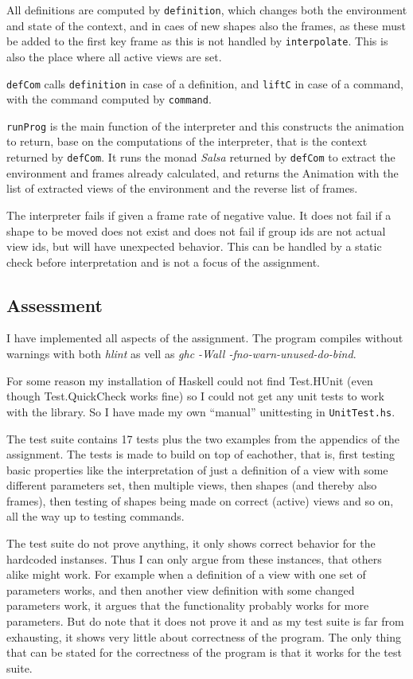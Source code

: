 \documentclass[a4paper, 10pt]{article}
\begin{document}
All definitions are computed by \texttt{definition}, which changes both the environment and state of the context, and in caes of new shapes also the frames, as these must be added to the first key frame as this is not handled by \texttt{interpolate}. This is also the place where all active views are set.

\texttt{defCom} calls \texttt{definition} in case of a definition, and \texttt{liftC} in case of a command, with the command computed by \texttt{command}.

\texttt{runProg} is the main function of the interpreter and this constructs the animation to return, base on the computations of the interpreter, that is the context returned by \texttt{defCom}. It runs the monad \textit{Salsa} returned by \texttt{defCom} to extract the environment and frames already calculated, and returns the Animation with the list of extracted views of the environment and the reverse list of frames.

The interpreter fails if given a frame rate of negative value.
It does not fail if a shape to be moved does not exist and does not fail if group ids are not actual view ids, but will have unexpected behavior.
This can be handled by a static check before interpretation and is not a focus of the assignment.

\subsection{Assessment}
I have implemented all aspects of the assignment.
The program compiles without warnings with both \textit{hlint} as vell as \textit{ghc -Wall -fno-warn-unused-do-bind}.

For some reason my installation of Haskell could not find Test.HUnit (even though Test.QuickCheck works fine) so I could not get any unit tests to work with the library. 
So I have made my own ``manual'' unittesting in \texttt{UnitTest.hs}. 

The test suite contains 17 tests plus the two examples from the appendics of the assignment. The tests is made to build on top of eachother, that is, first testing basic properties like the interpretation of just a definition of a view with some different parameters set, then multiple views, then shapes (and thereby also frames), then testing of shapes being made on correct (active) views and so on, all the way up to testing commands.

The test suite do not prove anything, it only shows correct behavior for the hardcoded instanses. Thus I can only argue from these instances, that others alike might work. For example when a definition of a view with one set of parameters works, and then another view definition with some changed parameters work, it argues that the functionality probably works for more parameters. But do note that it does not prove it and as my test suite is far from exhausting, it shows very little about correctness of the program. The only thing that can be stated for the correctness of the program is that it works for the test suite.
\end{document}
